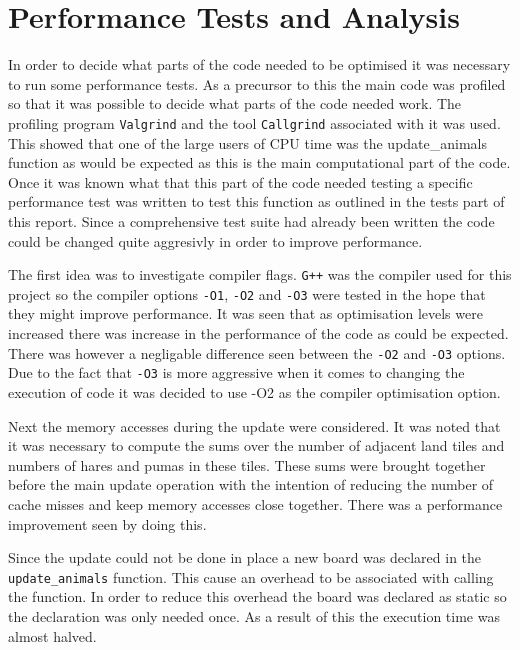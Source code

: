 \section{Performance Tests and Analysis}
In order to decide what parts of the code needed to be optimised it was necessary to run some performance tests.
As a precursor to this the main code was profiled so that it was possible to decide what parts of the code needed work.
The profiling program \texttt{Valgrind} and the tool \texttt{Callgrind} associated with it was used.
This showed that one of the large users of CPU time was the update\_animals function as would be expected as this is the main computational part of the code.
Once it was known what that this part of the code needed testing a specific performance test was written to test this function as outlined in the tests part of this report.
Since a comprehensive test suite had already been written the code could be changed quite aggresivly in order to improve performance.

The first idea was to investigate compiler flags.
\texttt{G++} was the compiler used for this project so the compiler options \texttt{-O1}, \texttt{-O2} and \texttt{-O3} were tested in the hope that they might improve performance.
It was seen that as optimisation levels were increased there was increase in the performance of the code as could be expected.
There was however a negligable difference seen between the \texttt{-O2} and \texttt{-O3} options.
Due to the fact that \texttt{-O3} is more aggressive when it comes to changing the execution of code it was decided to use -O2 as the compiler optimisation option.

Next the memory accesses during the update were considered.
It was noted that it was necessary to compute the sums over the number of adjacent land tiles and numbers of hares and pumas in these tiles.
These sums were brought together before the main update operation with the intention of reducing the number of cache misses and keep memory accesses close together.
There was a performance improvement seen by doing this.

Since the update could not be done in place a new board was declared in the \texttt{update\_animals} function.
This cause an overhead to be associated with calling the function.
In order to reduce this overhead the board was declared as static so the declaration was only needed once.
As a result of this the execution time was almost halved.

